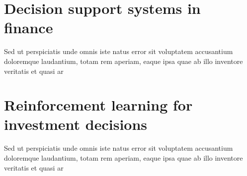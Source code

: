 \section{Decision support systems in finance}

Sed ut perspiciatis unde omnis iste natus error sit voluptatem accusantium doloremque laudantium, totam rem aperiam, eaque ipsa quae ab illo inventore veritatis et quasi ar

\section{Reinforcement learning for investment decisions}

Sed ut perspiciatis unde omnis iste natus error sit voluptatem accusantium doloremque laudantium, totam rem aperiam, eaque ipsa quae ab illo inventore veritatis et quasi ar
